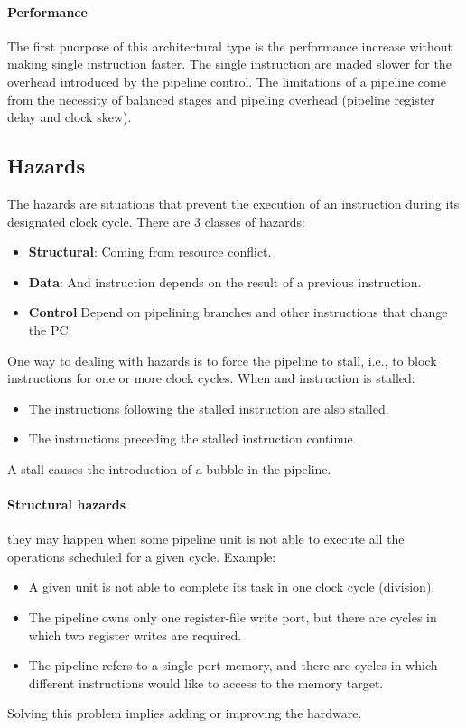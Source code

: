 \documentclass[12pt]{article}
\begin{document}
\paragraph{Performance} The first puorpose of this architectural type is the performance increase without making single instruction faster. The single instruction are maded slower for the overhead introduced by the pipeline control. The limitations of a pipeline come from the necessity of balanced stages and pipeling overhead (pipeline register delay and clock skew).

\subsection{Hazards}
The hazards are situations that prevent the execution of an instruction during its designated clock cycle. There are 3 classes of hazards:
\begin{itemize}
  \item \textbf{Structural}: Coming from resource conflict.
  \item \textbf{Data}: And instruction depends on the result of a previous instruction.
  \item \textbf{Control}:Depend on pipelining branches and other instructions that change the PC.
\end{itemize}
One way to dealing with hazards is to force the pipeline to stall, i.e., to block instructions for one or more clock cycles. When and instruction is stalled:
\begin{itemize}
  \item The instructions following the stalled instruction are also stalled.
  \item The instructions preceding the stalled instruction continue.
\end{itemize}
A stall causes the introduction of a bubble in the pipeline.

\paragraph{Structural hazards} they may happen when some pipeline unit is not able to execute all the operations scheduled for a given cycle. Example:
\begin{itemize}
  \item A given unit is not able to complete its task in one clock cycle (division).
  \item The pipeline owns only one register-file write port, but there are cycles in which two register writes are required.
  \item The pipeline refers to a single-port memory, and there are cycles in which different instructions would like to access to the memory target.
\end{itemize}
Solving this problem implies adding or improving the hardware.
\end{document}
